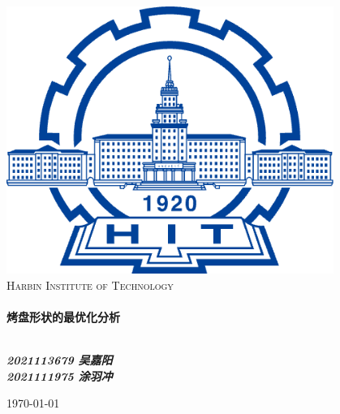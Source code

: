\documentclass{my_paper}
\begin{document}
\begin{titlepage}

    \begin{center}


        \includegraphics[width=0.8\textwidth]{hitlogo.png}\\[1cm]

        \textsc{\LARGE Harbin Institute of Technology}\\[1.5cm]

        \hrulefill \\[0.4cm]
        { \huge \bfseries 烤盘形状的最优化分析}\\[0.4cm]
        \hrulefill \\[1.5cm]

        \begin{minipage}{0.4\textwidth}
            \begin{flushleft} \large
            \end{flushleft}
        \end{minipage}
        \begin{center}
            \large
            \bfseries
            \emph{2021113679 \quad 吴嘉阳}\\
            \emph{2021111975 \quad 涂羽冲}
        \end{center}

        \vfill

        {\large \today}

    \end{center}
\end{titlepage}
\end{document}
